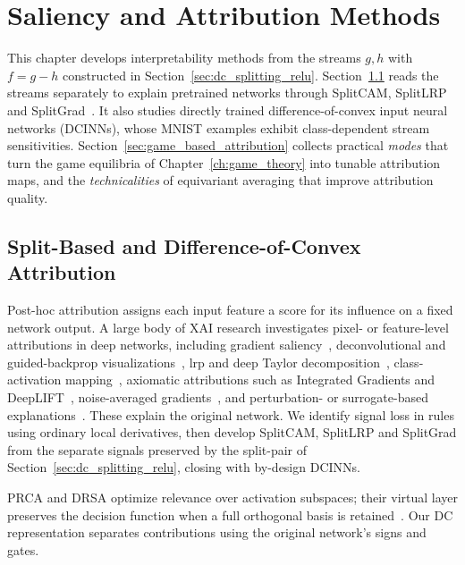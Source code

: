 \chapter{Saliency and Attribution Methods}\label{ch:saliency}

This chapter develops interpretability methods from the streams $g,h$ with $f=g-h$ constructed in Section~\ref{sec:dc_splitting_relu}. Section~\ref{sec:split_attribution_concept} reads the streams separately to explain pretrained networks through SplitCAM, SplitLRP and SplitGrad~\parencite{hiddenMono}. It also studies directly trained difference-of-convex input neural networks (DCINNs), whose MNIST examples exhibit class-dependent stream sensitivities. Section~\ref{sec:game_based_attribution} collects practical \emph{modes} that turn the game equilibria of Chapter~\ref{ch:game_theory} into tunable attribution maps, and the \emph{technicalities} of equivariant averaging that improve attribution quality.

\section{Split-Based and Difference-of-Convex Attribution}\label{sec:split_attribution_concept}

Post-hoc attribution assigns each input feature a score for its influence on a fixed network output. A large body of XAI research investigates pixel- or feature-level attributions in deep networks, including gradient saliency~\parencite{Simonyan2014}, deconvolutional and guided-backprop visualizations~\parencite{ZeilerFergus2014,Springenberg2015}, \ac{lrp} and deep Taylor decomposition~\parencite{Bach2015,Montavon2017DeepTaylor}, class-activation mapping~\parencite{Zhou2016,Selvaraju2017}, axiomatic attributions such as Integrated Gradients and DeepLIFT~\parencite{Sundararajan2017,Shrikumar2017}, noise-averaged gradients~\parencite{Smilkov2017}, and perturbation- or surrogate-based explanations~\parencite{Ribeiro2016,FongVedaldi2017,LundbergLee2017,Kolek2023_ShearletX,Fel2023_EVA}. These explain the original network. We identify signal loss in rules using ordinary local derivatives, then develop SplitCAM, SplitLRP and SplitGrad from the separate signals preserved by the split-pair of Section~\ref{sec:dc_splitting_relu}, closing with by-design DCINNs.

PRCA and DRSA optimize relevance over activation subspaces; their virtual layer preserves the decision function when a full orthogonal basis is retained~\parencite{Chormai2024DRSA}. Our DC representation separates contributions using the original network's signs and gates.

